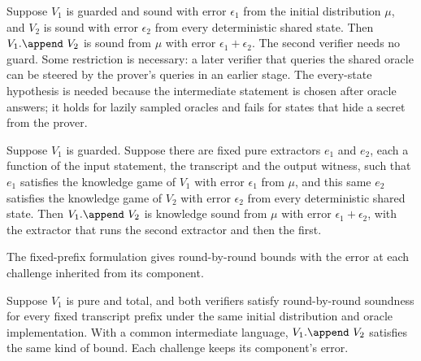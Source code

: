 \begin{theorem}
    \label{thm:soundness_append}
    Suppose $V_1$ is guarded and sound with error $\epsilon_1$ from the initial distribution $\mu$,
    and $V_2$ is sound with error $\epsilon_2$ from every deterministic shared state. Then
    $V_1.\append\ V_2$ is sound from $\mu$ with error $\epsilon_1 + \epsilon_2$. The second verifier
    needs no guard. Some restriction is necessary: a later verifier that queries the shared oracle
    can be steered by the prover's queries in an earlier stage. The every-state hypothesis is needed
    because the intermediate statement is chosen after oracle answers; it holds for lazily sampled
    oracles and fails for states that hide a secret from the prover.
    \leanok
\end{theorem}

\begin{theorem}
    \label{thm:knowledge_soundness_append}
    Suppose $V_1$ is guarded. Suppose there are fixed pure extractors $e_1$ and $e_2$, each a
    function of the input statement, the transcript and the output witness, such that $e_1$
    satisfies the knowledge game of $V_1$ with error $\epsilon_1$ from $\mu$, and this same $e_2$
    satisfies the knowledge game of $V_2$ with error $\epsilon_2$ from every deterministic shared
    state. Then $V_1.\append\ V_2$ is
    knowledge sound from $\mu$ with error $\epsilon_1 + \epsilon_2$, with the extractor that runs the
    second extractor and then the first.
    \leanok
\end{theorem}

The fixed-prefix formulation gives round-by-round bounds with the error at each challenge
inherited from its component.

\begin{theorem}
    \label{thm:rbr_soundness_append_pure_first}
    Suppose $V_1$ is pure and total, and both verifiers satisfy round-by-round soundness for every
    fixed transcript prefix under the same initial distribution and oracle implementation.
    With a common intermediate language, $V_1.\append\ V_2$ satisfies the same kind of bound.
    Each challenge keeps its component's error.
    \leanok
\end{theorem}

